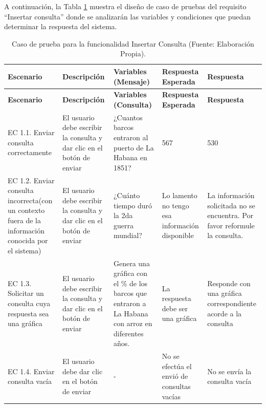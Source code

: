 A continuación, la Tabla \ref{tab:caso_prueba_enviar_consulta}  muestra el diseño de caso de pruebas del requisito “Insertar consulta” donde se analizarán las variables y condiciones que puedan determinar la respuesta del sistema.


\begin{small} 
	\begin{longtable}{|p{2.2cm}|p{3cm}|p{3.2cm}|p{3.2cm}|p{3.2cm}|}
		\caption{Caso de prueba para la funcionalidad Insertar Consulta (Fuente: Elaboración Propia).} \label{tab:caso_prueba_enviar_consulta} \\
		\hline
		\textbf{Escenario} & \textbf{Descripción} & \textbf{Variables (Mensaje)} & \textbf{Respuesta Esperada} & \textbf{Respuesta} \\
		\hline
		\endfirsthead
		
		\hline
		\textbf{Escenario} & \textbf{Descripción} & \textbf{Variables (Consulta)} & \textbf{Respuesta Esperada} & \textbf{Respuesta} \\
		\hline
		\endhead
		
		\hline
		\endfoot
		
		\hline
		\endlastfoot
		
		EC 1.1. Enviar consulta correctamente & El usuario debe escribir la consulta y dar clic en el botón de enviar & ¿Cuantos barcos entraron al puerto de La Habana en 1851? & 567 & 530 \\
		\hline
		EC 1.2. Enviar consulta incorrecta(con un contexto fuera de la información conocida por el sistema) & El usuario debe escribir la consulta y dar clic en el botón de enviar & ¿Cuánto tiempo duró la 2da guerra mundial? & Lo lamento no tengo esa información disponible & La información solicitada no se encuentra. Por favor reformule la consulta. \\
		\hline
		EC 1.3. Solicitar un consulta cuya respuesta sea una gráfica & El usuario debe escribir la consulta y dar clic en el botón de enviar & Genera una gráfica con el \% de los barcos que entraron a La Habana con arroz en diferentes años. & La respuesta debe ser una gráfica & Responde con una gráfica correspondiente acorde a la consulta \\
		\hline
		\hline
		EC 1.4. Enviar consulta vacía & El usuario debe dar clic en el botón de enviar & - & No se efectúa el envió de consultas vacías & No se envía la consulta vacía \\
		\hline
		
	\end{longtable}
\end{small}

